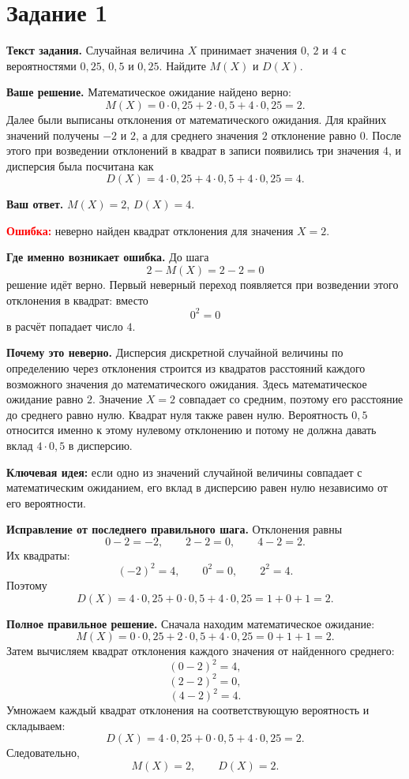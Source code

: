 \documentclass[12pt,a4paper]{article}
\begin{document}
\newpage
{}\label{task:1}
\section*{Задание 1}

\textbf{Текст задания.}
Случайная величина $X$ принимает значения $0$, $2$ и $4$ с вероятностями $0{,}25$, $0{,}5$ и $0{,}25$. Найдите $M(X)$ и $D(X)$.

\textbf{Ваше решение.}
Математическое ожидание найдено верно:
\[
M(X)=0\cdot0{,}25+2\cdot0{,}5+4\cdot0{,}25=2.
\]
Далее были выписаны отклонения от математического ожидания. Для крайних значений получены $-2$ и $2$, а для среднего значения $2$ отклонение равно $0$. После этого при возведении отклонений в квадрат в записи появились три значения $4$, и дисперсия была посчитана как
\[
D(X)=4\cdot0{,}25+4\cdot0{,}5+4\cdot0{,}25=4.
\]

\textbf{Ваш ответ.}
$M(X)=2$, $D(X)=4$.

\textcolor{red}{\textbf{Ошибка:}} неверно найден квадрат отклонения для значения $X=2$.

\textbf{Где именно возникает ошибка.}
До шага
\[
2-M(X)=2-2=0
\]
решение идёт верно. Первый неверный переход появляется при возведении этого отклонения в квадрат: вместо
\[
0^2=0
\]
в расчёт попадает число $4$.

\textbf{Почему это неверно.}
Дисперсия дискретной случайной величины по определению через отклонения строится из квадратов расстояний каждого возможного значения до математического ожидания. Здесь математическое ожидание равно $2$. Значение $X=2$ совпадает со средним, поэтому его расстояние до среднего равно нулю. Квадрат нуля также равен нулю. Вероятность $0{,}5$ относится именно к этому нулевому отклонению и потому не должна давать вклад $4\cdot0{,}5$ в дисперсию.

\textcolor{blue!60!black}{\textbf{Ключевая идея:}} если одно из значений случайной величины совпадает с математическим ожиданием, его вклад в дисперсию равен нулю независимо от его вероятности.

\textbf{Исправление от последнего правильного шага.}
Отклонения равны
\[
0-2=-2,\qquad 2-2=0,\qquad 4-2=2.
\]
Их квадраты:
\[
(-2)^2=4,\qquad 0^2=0,\qquad 2^2=4.
\]
Поэтому
\[
D(X)=4\cdot0{,}25+0\cdot0{,}5+4\cdot0{,}25=1+0+1=2.
\]

\textbf{Полное правильное решение.}
Сначала находим математическое ожидание:
\[
M(X)=0\cdot0{,}25+2\cdot0{,}5+4\cdot0{,}25=0+1+1=2.
\]
Затем вычисляем квадрат отклонения каждого значения от найденного среднего:
\[
(0-2)^2=4,
\]
\[
(2-2)^2=0,
\]
\[
(4-2)^2=4.
\]
Умножаем каждый квадрат отклонения на соответствующую вероятность и складываем:
\[
D(X)=4\cdot0{,}25+0\cdot0{,}5+4\cdot0{,}25=2.
\]
Следовательно,
\[
M(X)=2,\qquad D(X)=2.
\]
\end{document}

